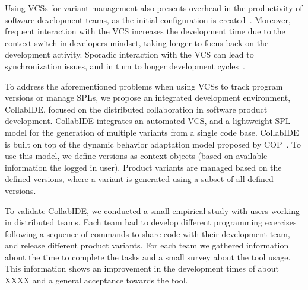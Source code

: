Using \acp{VCS} for variant management also presents overhead in the productivity of software development teams, as the initial configuration is created~\cite{niu14}.
Moreover, frequent interaction with the \ac{VCS} increases the development time due to the context switch in developers mindset, taking longer to focus back on the development activity. Sporadic interaction with the \ac{VCS} can lead to synchronization issues, and in turn to longer development cycles~\cite{schwagerl15}.  

To address the aforementioned problems when using \acp{VCS} to track program versions or manage \acp{SPL}, we propose an integrated development environment, CollabIDE, focused on the distributed  collaboration in software product development. CollabIDE integrates an automated \ac{VCS}, and a lightweight \ac{SPL} model for the generation of multiple variants from a single code base. 
CollabIDE is built on top of the dynamic behavior adaptation model proposed by \ac{COP}~\cite{salvaneschi13taas}. To use this model, we define versions as context objects (based on available information \eg the logged in user).
Product variants are managed based on the defined versions, where a variant is generated using a subset of all defined versions.

To validate CollabIDE, we conducted a small empirical study with users 
working in distributed teams. Each team had to develop different programming exercises following a sequence of commands to share code with their development team, and release different product variants. For each team we gathered information about the time to complete the tasks and a small survey about the tool usage. This information shows an improvement in the development times of about XXXX and a general acceptance towards the tool.
 



\endinput

With CollabIDE, we aim to solve the overhead problems that exists in these development models with 
features that aim to reduce the time developers must spend doing actions related to version control or 
setting up a project that uses \acp{SPL}.
